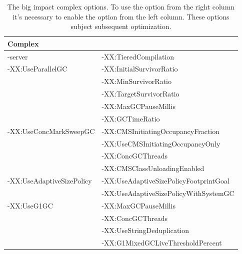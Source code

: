 \documentclass[
  digital, %
  oneside,
  notable, %
  nolof,     %
  nolot     %
]{fithesis3}
\begin{document}
\begin{table}[]
	\centering
	\begin{tabular}{|l|l|}
		\hline
		\multicolumn{2}{|l|}{\textbf{Complex}}                                              \\ \hline
		-server                                    & -XX:TieredCompilation                  \\ \hline
		\multirow{5}{*}{-XX:UseParallelGC}         & -XX:InitialSurvivorRatio               \\ \cline{2-2} 
		& -XX:MinSurvivorRatio                   \\ \cline{2-2} 
		& -XX:TargetSurvivorRatio                \\ \cline{2-2} 
		& -XX:MaxGCPauseMillis                   \\ \cline{2-2} 
		& -XX:GCTimeRatio                        \\ \hline
		\multirow{4}{*}{-XX:UseConcMarkSweepGC}    & -XX:CMSInitiatingOccupancyFraction     \\ \cline{2-2} 
		& -XX:UseCMSInitiatingOccupancyOnly      \\ \cline{2-2} 
		& -XX:ConcGCThreads                      \\ \cline{2-2} 
		& -XX:CMSClassUnloadingEnabled           \\ \hline
		\multirow{2}{*}{-XX:UseAdaptiveSizePolicy} & -XX:UseAdaptiveSizePolicyFootprintGoal \\ \cline{2-2} 
		& -XX:UseAdaptiveSizePolicyWithSystemGC  \\ \hline
		\multirow{4}{*}{-XX:UseG1GC}               & -XX:MaxGCPauseMillis                    \\ \cline{2-2} 
		& -XX:ConcGCThreads                      \\ \cline{2-2} 
		& -XX:UseStringDeduplication             \\ \cline{2-2} 
		& -XX:G1MixedGCLiveThresholdPercent      \\ \hline
	\end{tabular}
	\caption{The big impact complex options. To use the option from the right column it's necessary to enable the  option from the left column. These options subject subsequent optimization.}
	\label{bigimpactcomplex}
\end{table}
\end{document}
